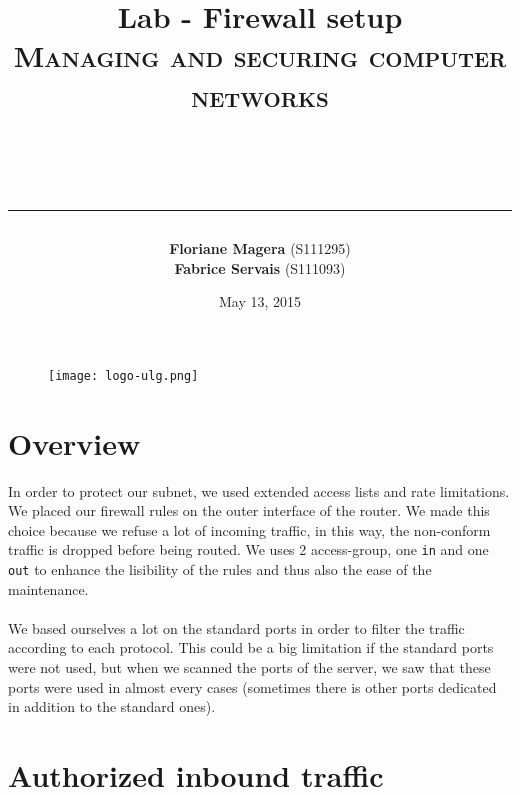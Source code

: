 \documentclass[a4paper,titlepage]{article}
\begin{document}
\begin{titlepage}

\begin{figure}
\centering
\texttt{[image: logo-ulg.png]}
\end{figure}



\title{
\vspace{0.2cm}
\LARGE{\textbf{Lab - Firewall setup }} \\ \textsc{Managing and securing computer networks}
\author{\textbf{Floriane Magera} \small{(S111295})\\\textbf{Fabrice Servais} \small{(S111093})}\\
\date{May 13, 2015}
\rule{15cm}{1.5pt}
}

\end{titlepage}

\pagestyle{fancy}

\maketitle

\section{Overview}
In order to protect our subnet, we used extended access lists and rate limitations. We placed our firewall rules on the outer interface of the router. We made this choice because we refuse a lot of incoming traffic, in this way, the non-conform traffic is dropped before being routed. We uses 2 access-group, one \texttt{in} and one \texttt{out} to enhance the lisibility of the rules and thus also the ease of the maintenance.

\paragraph{}
 We based ourselves a lot on the standard ports in order to filter the traffic according to each protocol. This could be a big limitation if the standard ports were not used, but when we scanned the ports of the server, we saw that these ports were used in almost every cases (sometimes there is other ports dedicated in addition to the standard ones).
\section{Authorized inbound traffic}
\end{document}
